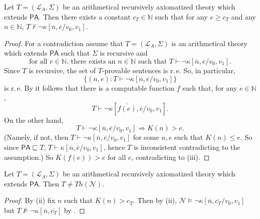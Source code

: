 \begin{thm} \label{thm:ChaitinIncomp}
Let $T=(\mathcal{L}_A, \Sigma)$ be an arithmetical recursively axiomatized theory which extends $\mathsf{PA}$. Then there exists a constant $c_T \in \mathbb{N}$ such that for any $e \geq c_T$ and any $n \in \mathbb{N}$, $T \nvdash \lnot \kappa[\overline{n}, \overline{e}/v_0,v_1]$.
\end{thm}
\begin{proof}
For a contradiction assume that $T= (\mathcal{L}_A, \Sigma)$ is an arithmetical theory which extends $\mathsf{PA}$ such that $\Sigma$ is recursive and 
\begin{equation}\label{eq:chait1}
\text{for all }e \in \mathbb{N}\text{, there exists an }n \in \mathbb{N}\text{ such that } T \vdash \lnot \kappa[\overline{n}, \overline{e}/v_0,v_1].
\end{equation}
Since $T$ is recursive, the set of $T$-provable sentences is r.\,e. So, in particular,
\[ \lbrace (n,e) : T \vdash \lnot \kappa[\overline{n}, \overline{e}/v_0,v_1] \rbrace \]
is r.\,e. By  it follows that there is a computable function $f$ such that, for any $e \in \mathbb{N}$, 
\[ T \vdash \lnot \kappa[\overline{f(e)}, \overline{e}/v_0,v_1]. \]
On the other hand, \[T\vdash \lnot \kappa[\overline{n}, \overline{e}/v_0,v_1] \Rightarrow K(n) > e.\]
(Namely, if not, then $T \vdash \lnot \kappa[\overline{n}, \overline{e}/v_0,v_1]$ for some $n, e$ such that $K(n) \le e$. So since $\mathsf{PA} \sqsubseteq T$, $T \vdash \kappa[\overline{n}, \overline{e}/v_0,v_1]$, hence $T$ is inconsistent contradicting to the assumption.) So $K(f(e)) >e$ for all $e$, contradicting to (iii).
\end{proof}

\begin{cor}
Let $T=(\mathcal{L}_A, \Sigma)$ be an arithmetical recursively axiomatized theory which extends $\mathsf{PA}$. Then $T \neq \mathit{Th}(\mathcal{N})$.
\end{cor}
\begin{proof}
By (ii) fix $n$ such that $K(n)> c_T$. Then by (ii), $\mathcal{N} \vDash \lnot \kappa[\overline{n}, \overline{c_T}/v_0,v_1]$ but $T \nvDash \lnot \kappa[\overline{n}, \overline{c_T}]$ by .
\end{proof}

